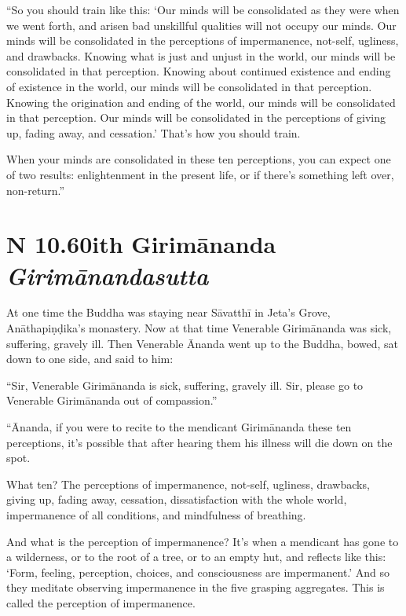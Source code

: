 \documentclass[12pt,openany]{book}%
\newcommand*{\suttatitleacronym}[1]{\smaller[2]{#1}\vspace*{.3em}}
\newcommand*{\suttatitletranslation}[1]{\linebreak{#1}}
\newcommand*{\suttatitleroot}[1]{\linebreak\smaller[2]\itshape{#1}}
\newcommand*{\tocacronym}[1]{\hspace*{-3.3em}{#1}\quad}
\newcommand*{\toctranslation}[1]{#1}
\newcommand*{\tocroot}[1]{(\textit{#1})}
\begin{document}
“So you should train like this: ‘Our minds will be consolidated as they were when we went forth, and arisen bad unskillful qualities will not occupy our minds. Our minds will be consolidated in the perceptions of impermanence, not-self, ugliness, and drawbacks. Knowing what is just and unjust in the world, our minds will be consolidated in that perception. Knowing about continued existence and ending of existence in the world, our minds will be consolidated in that perception. Knowing the origination and ending of the world, our minds will be consolidated in that perception. Our minds will be consolidated in the perceptions of giving up, fading away, and cessation.’ That’s how you should train. 

When your minds are consolidated in these ten perceptions, you can expect one of two results: enlightenment in the present life, or if there’s something left over, non-return.” 

%
\section*{{\suttatitleacronym AN 10.60}{\suttatitletranslation With Girimānanda }{\suttatitleroot Girimānandasutta}}
\addcontentsline{toc}{section}{\tocacronym{AN 10.60} \toctranslation{With Girimānanda } \tocroot{Girimānandasutta}}

At one time the Buddha was staying near \textsanskrit{Sāvatthī} in Jeta’s Grove, \textsanskrit{Anāthapiṇḍika}’s monastery. Now at that time Venerable \textsanskrit{Girimānanda} was sick, suffering, gravely ill. Then Venerable Ānanda went up to the Buddha, bowed, sat down to one side, and said to him: 

“Sir, Venerable \textsanskrit{Girimānanda} is sick, suffering, gravely ill. Sir, please go to Venerable \textsanskrit{Girimānanda} out of compassion.” 

“Ānanda, if you were to recite to the mendicant \textsanskrit{Girimānanda} these ten perceptions, it’s possible that after hearing them his illness will die down on the spot. 

What ten? The perceptions of impermanence, not-self, ugliness, drawbacks, giving up, fading away, cessation, dissatisfaction with the whole world, impermanence of all conditions, and mindfulness of breathing. 

And what is the perception of impermanence? It’s when a mendicant has gone to a wilderness, or to the root of a tree, or to an empty hut, and reflects like this: ‘Form, feeling, perception, choices, and consciousness are impermanent.’ And so they meditate observing impermanence in the five grasping aggregates. This is called the perception of impermanence. 
\end{document}
